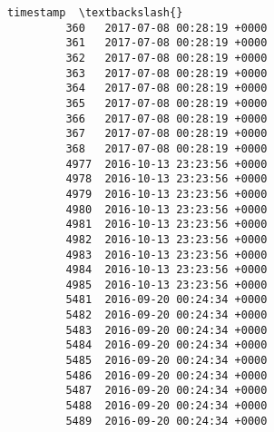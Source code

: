 \documentclass[11pt]{article}
\begin{document}
\begin{Verbatim}[commandchars=\\\{\}]
                               timestamp  \textbackslash{}
         360   2017-07-08 00:28:19 +0000   
         361   2017-07-08 00:28:19 +0000   
         362   2017-07-08 00:28:19 +0000   
         363   2017-07-08 00:28:19 +0000   
         364   2017-07-08 00:28:19 +0000   
         365   2017-07-08 00:28:19 +0000   
         366   2017-07-08 00:28:19 +0000   
         367   2017-07-08 00:28:19 +0000   
         368   2017-07-08 00:28:19 +0000   
         4977  2016-10-13 23:23:56 +0000   
         4978  2016-10-13 23:23:56 +0000   
         4979  2016-10-13 23:23:56 +0000   
         4980  2016-10-13 23:23:56 +0000   
         4981  2016-10-13 23:23:56 +0000   
         4982  2016-10-13 23:23:56 +0000   
         4983  2016-10-13 23:23:56 +0000   
         4984  2016-10-13 23:23:56 +0000   
         4985  2016-10-13 23:23:56 +0000   
         5481  2016-09-20 00:24:34 +0000   
         5482  2016-09-20 00:24:34 +0000   
         5483  2016-09-20 00:24:34 +0000   
         5484  2016-09-20 00:24:34 +0000   
         5485  2016-09-20 00:24:34 +0000   
         5486  2016-09-20 00:24:34 +0000   
         5487  2016-09-20 00:24:34 +0000   
         5488  2016-09-20 00:24:34 +0000   
         5489  2016-09-20 00:24:34 +0000   
         

\end{Verbatim}
\end{document}
